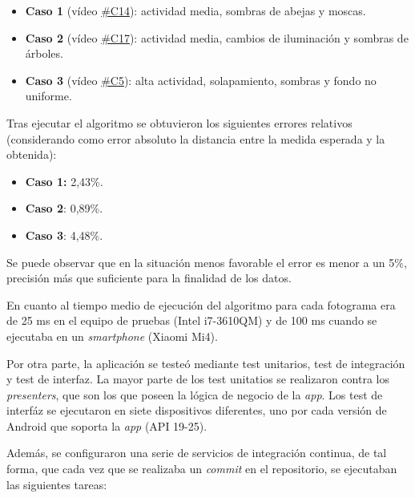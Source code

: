 \begin{itemize}
\tightlist
\item
  \textbf{Caso 1} (vídeo \href{https://youtu.be/9pkPCnS2aRY}{\#C14}):
  actividad media, sombras de abejas y moscas.
\item
  \textbf{Caso 2} (vídeo \href{https://youtu.be/ENocXS3cEP0}{\#C17}):
  actividad media, cambios de iluminación y sombras de árboles.
\item
  \textbf{Caso 3} (vídeo \href{https://youtu.be/YjGX4mC7pO4}{\#C5}):
  alta actividad, solapamiento, sombras y fondo no uniforme.
\end{itemize}

Tras ejecutar el algoritmo se obtuvieron los siguientes errores
relativos (considerando como error absoluto la distancia entre la medida
esperada y la obtenida):

\begin{itemize}
\tightlist
\item
  \textbf{Caso 1:} 2,43\%.
\item
  \textbf{Caso 2}: 0,89\%.
\item
  \textbf{Caso 3}: 4,48\%.
\end{itemize}

Se puede observar que en la situación menos favorable el error es menor
a un 5\%, precisión más que suficiente para la finalidad de los datos.

En cuanto al tiempo medio de ejecución del algoritmo para cada fotograma
era de 25 ms en el equipo de pruebas (Intel i7-3610QM) y de 100 ms
cuando se ejecutaba en un \emph{smartphone} (Xiaomi Mi4).

Por otra parte, la aplicación se testeó mediante test unitarios, test de
integración y test de interfaz. La mayor parte de los test unitatios se
realizaron contra los \emph{presenters}, que son los que poseen la
lógica de negocio de la \emph{app}. Los test de interfáz se ejecutaron
en siete dispositivos diferentes, uno por cada versión de Android que
soporta la \emph{app} (API 19-25).

Además, se configuraron una serie de servicios de integración continua,
de tal forma, que cada vez que se realizaba un \emph{commit} en el
repositorio, se ejecutaban las siguientes tareas:

